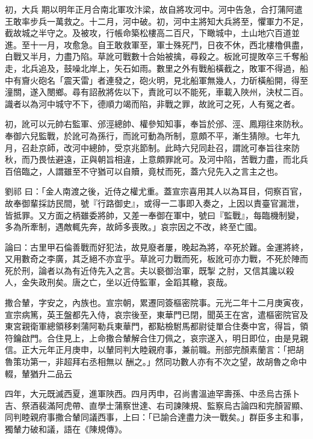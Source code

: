 \begin{pinyinscope}
 初，大兵
 期以明年正月合南北軍攻汴梁，故自將攻河中。河中告急，合打蒲阿遣王敢率步兵一萬救之。十二月，河中破。初，河中主將知大兵將至，懼軍力不足，截故城之半守之。及被攻，行帳命築松樓高二百尺，下瞰城中，土山地穴百道並進。至十一月，攻愈急。自王敢救軍至，軍士殊死鬥，日夜不休，西北樓櫓俱盡，白戰又半月，力盡乃陷。草訛可戰數十合始被擒，尋殺之。板訛可提敗卒三千奪船走，北兵追及，鼓噪北岸上，矢石如雨。數里之外有戰船橫截之，敗軍不得過，船中有齎火砲名「震天雷」者連發之，砲火明，見北船軍無幾人，力斫橫船開，得至
 潼關，遂入閿鄉。尋有詔赦將佐以下，責訛可以不能死，車載入陜州，決杖二百。識者以為河中城守不下，德順力竭而陷，非戰之罪，故訛可之死，人有冤之者。



 初，訛可以元帥右監軍、邠涇總帥、權參知知事，奉旨於邠、涇、鳳翔往來防秋。奉御六兒監戰，於訛可為孫行，而訛可動為所制，意頗不平，漸生猜隙。七年九月，召赴京師，改河中總帥，受京兆節制。此時六兒同赴召，謂訛可奉旨往來防秋，而乃畏怯避遠，正與朝旨相違，上意頗罪訛可。及河中陷，苦戰力盡，而北兵百倍臨之，人謂雖至不守猶可以自贖，竟杖而死，蓋六兒先入之言主之也。



 劉祁
 曰：「金人南渡之後，近侍之權尤重。蓋宣宗喜用其人以為耳目，伺察百官，故奉御輩採訪民間，號『行路御史』，或得一二事即入奏之，上因以責臺官漏泄，皆抵罪。又方面之柄雖委將帥，又差一奉御在軍中，號曰『監戰』，每臨機制變，多為所牽制，遇敵輒先奔，故師多喪敗。」哀宗因之不改，終至亡國。



 論曰：古里甲石倫善戰而好犯法，故見廢者屢，晚起為將，卒死於難。金運將終，又用數奇之李廣，其乏絕不亦宜乎。草訛可力戰而死，板訛可亦力戰，不死於陣而死於刑，論者以為有近侍先入之言。夫以褻御治軍，既掣
 之肘，又信其讒以殺人，金失政刑矣。唐之亡，坐以近侍監軍，金蹈其轍，哀哉。



 撒合輦，字安之，內族也。宣宗朝，累遷同簽樞密院事。元光二年十二月庚寅夜，宣宗病篤，英王盤都先入侍，哀宗後至，東華門已閉，聞英王在宮，遣樞密院官及東宮親衛軍總領移剌蒲阿勒兵東華門，都點檢駙馬都尉徒單合住奏中宮，得旨，領符鑰啟門。合住見上，上命撒合輦解合住刀佩之，哀宗遂入，明日即位，由是見親信。正大元年正月庚申，以輦同判大睦親府事，兼前職。刑部完顏素蘭言：「把胡魯策功第一，非超拜右丞相無以
 酬之。」然同功數人亦有不次之望，故胡魯之命中輟，輦猶升二品云



 四年，大元既滅西夏，進軍陜西。四月丙申，召尚書溫迪罕壽孫、中丞烏古孫卜吉、祭酒裴滿阿虎帶、直學士蒲察世達、右司諫陳規、監察烏古論四和完顏習顯、同判睦親府事撒合輦同議西事，上曰：「已諭合達盡力決一戰矣。」群臣多主和事，獨輦力破和議，語在《陳規傳》。




\end{pinyinscope}
